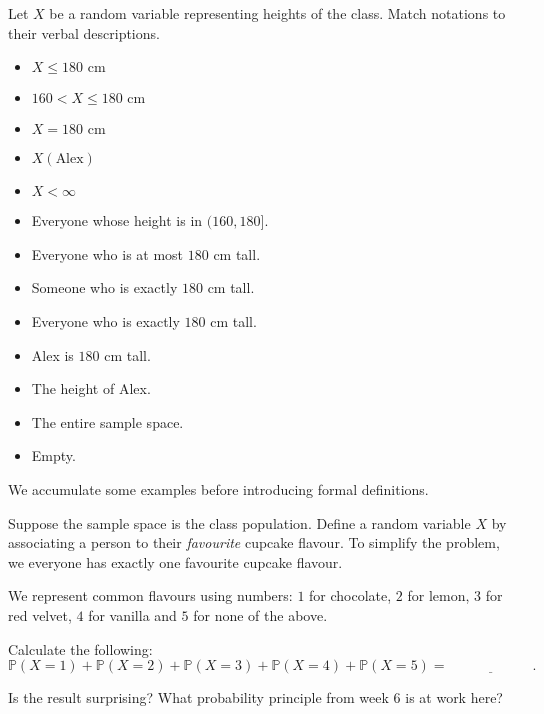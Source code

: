 \documentclass[../main.tex]{subfiles}
\begin{document}
\begin{example}
  Let \(X\) be a random variable representing heights of the class.  Match notations to their verbal descriptions. 

  \begin{multicols}{2}
    \begin{itemize}
      \item \(X \le 180 \text{ cm}\)
      \item \(160 < X \le 180 \text{ cm}\)
      \item \(X = 180 \text{ cm}\)
      \item \(X(\text{Alex})\)
      \item \( X < \infty\)
    \end{itemize}
    \columnbreak
    \begin{itemize}
      \item Everyone whose height is in \((160, 180]\).
      \item Everyone who is at most \(180\) cm tall.
      \item Someone who is exactly \(180\) cm tall.
      \item Everyone who is exactly \(180\) cm tall.
      \item Alex is \(180\) cm tall.
      \item The height of Alex.
      \item The entire sample space.
      \item Empty.
    \end{itemize}
  \end{multicols}
\end{example}

\clearpage
We accumulate some examples before introducing formal definitions.

\begin{example}
  Suppose the sample space is the class population.  Define a random variable \(X\) by associating a person to their \emph{favourite} cupcake flavour.  To simplify the problem, we  everyone has exactly one favourite cupcake flavour.

  We represent common flavours using numbers: \(1\) for chocolate, \(2\) for lemon, \(3\) for red velvet, \(4\) for vanilla and \(5\) for none of the above.

  Calculate the following:
  \[
    \mathbb{P}(X = 1) + \mathbb{P}(X = 2) + \mathbb{P}(X = 3) + \mathbb{P}(X = 4) + \mathbb{P}(X = 5) = \underline{\hspace{1in}}.
  \]

  Is the result surprising? What probability principle from week 6 is at work here?
\end{example}
\end{document}
